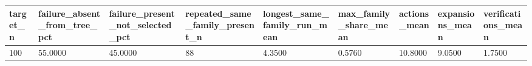 \begin{tabular}{lllllllll}
\hline
target\_n & failure\_absent\_from\_tree\_pct & failure\_present\_not\_selected\_pct & repeated\_same\_family\_present\_n & longest\_same\_family\_run\_mean & max\_family\_share\_mean & actions\_mean & expansions\_mean & verifications\_mean \\
\hline
100 & 55.0000 & 45.0000 & 88 & 4.3500 & 0.5760 & 10.8000 & 9.0500 & 1.7500 \\
\hline
\end{tabular}

